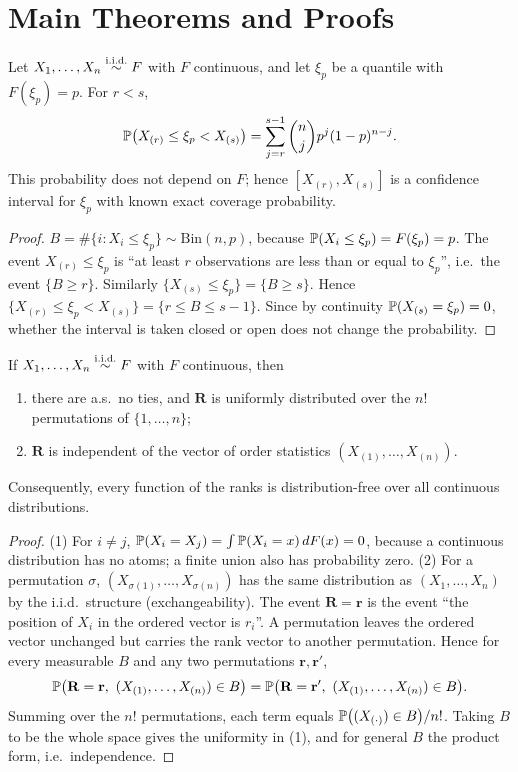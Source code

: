 \documentclass[main.tex]{subfiles}
\begin{document}
\section{Main Theorems and Proofs}

\begin{theorem}\label{thm:kantil-ga}
Let $X_1,\dots,X_n\iid F$ with $F$ continuous, and let $\xi_p$ be a quantile with $F(\xi_p)=p$. For $r<s$,
\[
\P\big(X_{(r)}\le\xi_p<X_{(s)}\big)=\sum_{j=r}^{s-1}\binom nj p^j(1-p)^{n-j}.
\]
This probability does not depend on $F$; hence $[X_{(r)},X_{(s)}]$ is a confidence interval for $\xi_p$ with known exact coverage probability.
\end{theorem}
\begin{proof}
$B=\#\{i:X_i\le\xi_p\}\sim\text{Bin}(n,p)$, because $\P(X_i\le\xi_p)=F(\xi_p)=p$. The event $X_{(r)}\le\xi_p$ is ``at least $r$ observations are less than or equal to $\xi_p$'', i.e.\ the event $\{B\ge r\}$. Similarly $\{X_{(s)}\le\xi_p\}=\{B\ge s\}$. Hence $\{X_{(r)}\le\xi_p<X_{(s)}\}=\{r\le B\le s-1\}$. Since by continuity $\P(X_{(s)}=\xi_p)=0$, whether the interval is taken closed or open does not change the probability.
\end{proof}

\begin{theorem}\label{thm:sira-dagilim}
If $X_1,\dots,X_n\iid F$ with $F$ continuous, then
\begin{enumerate}
  \item there are a.s.\ no ties, and $\mathbf R$ is uniformly distributed over the $n!$ permutations of $\{1,\dots,n\}$;
  \item $\mathbf R$ is independent of the vector of order statistics $(X_{(1)},\dots,X_{(n)})$.
\end{enumerate}
Consequently, every function of the ranks is distribution-free over all continuous distributions.
\end{theorem}
\begin{proof}
(1) For $i\ne j$, $\P(X_i=X_j)=\int\P(X_i=x)\,dF(x)=0$, because a continuous distribution has no atoms; a finite union also has probability zero. (2) For a permutation $\sigma$, $(X_{\sigma(1)},\dots,X_{\sigma(n)})$ has the same distribution as $(X_1,\dots,X_n)$ by the i.i.d.\ structure (exchangeability). The event $\mathbf R=\mathbf r$ is the event ``the position of $X_i$ in the ordered vector is $r_i$''. A permutation leaves the ordered vector unchanged but carries the rank vector to another permutation. Hence for every measurable $B$ and any two permutations $\mathbf r,\mathbf r'$,
\[
\P\big(\mathbf R=\mathbf r,\ (X_{(1)},\dots,X_{(n)})\in B\big)=\P\big(\mathbf R=\mathbf r',\ (X_{(1)},\dots,X_{(n)})\in B\big).
\]
Summing over the $n!$ permutations, each term equals $\P\big((X_{(\cdot)})\in B\big)/n!$. Taking $B$ to be the whole space gives the uniformity in (1), and for general $B$ the product form, i.e.\ independence.
\end{proof}
\end{document}
